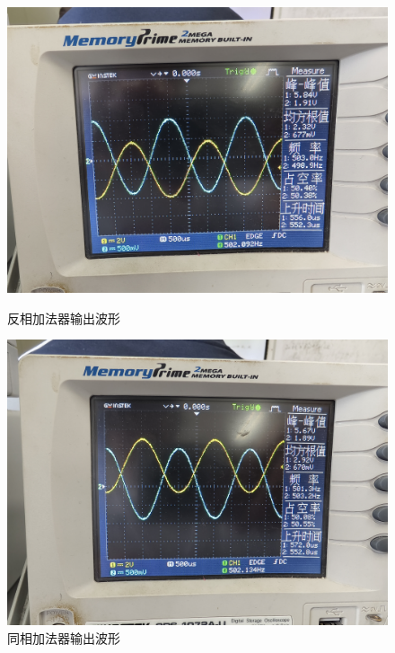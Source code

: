 \documentclass[10pt, a4paper]{article} %
\begin{document}
\begin{figure}[ht]
    
        \centering
        \begin{minipage}
    {0.45\textwidth}
            \centering
            \includegraphics[width=1.0\textwidth]{image/3.jpg}
            \caption{反相加法器输出波形}
            \label{fig:反相加法器输出波形}
        \end{minipage}
        \hfill
        \begin{minipage}
    {0.45\textwidth}
            \centering
            \includegraphics[width=1.0\textwidth]{image/4.jpg}
            \caption{同相加法器输出波形}
            \label{fig:同相加法器输出波形}
        \end{minipage}
\end{figure}
\end{document}
